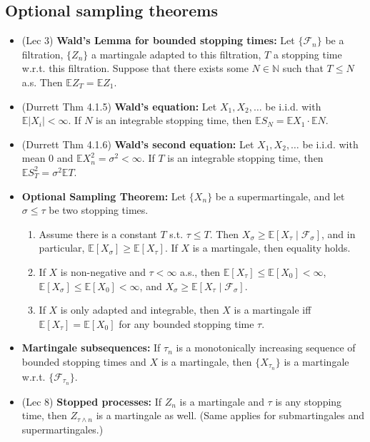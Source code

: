 \documentclass[twoside]{article}
\newcommand\bbE{\mathbb{E}}
\newcommand\bbN{\mathbb{N}}
\newcommand\calF{\mathcal{F}}
\newcommand\sg{\sigma}
\begin{document}
\subsection*{Optional sampling theorems}
\begin{itemize}
\item (Lec 3) \textbf{Wald's Lemma for bounded stopping times:} Let $\{\calF_n \}$ be a filtration, $\{ Z_n \}$ a martingale adapted to this filtration, $T$ a stopping time w.r.t. this filtration. Suppose that there exists some $N \in \bbN$ such that $T \leq N$ a.s. Then $\bbE Z_T = \bbE Z_1$.

\item (Durrett Thm 4.1.5) \textbf{Wald's equation:} Let $X_1, X_2, \dots$ be i.i.d. with $\bbE |X_i| < \infty$. If $N$ is an integrable stopping time, then $\bbE S_N = \bbE X_1 \cdot \bbE N$.

\item (Durrett Thm 4.1.6) \textbf{Wald's second equation:} Let $X_1, X_2, \dots$ be i.i.d. with mean 0 and $\bbE X_n^2 = \sg^2 < \infty$. If $T$ is an integrable stopping time, then $\bbE S_T^2 = \sg^2 \bbE T$.

\item \textbf{Optional Sampling Theorem:} Let $\{X_n\}$ be a supermartingale, and let $\sg \leq \tau$ be two stopping times.
\begin{enumerate}
\item Assume there is a constant $T$ s.t. $\tau \leq T$. Then $X_\sg \geq \bbE [X_\tau \mid \calF_\sg]$, and in particular, $\bbE [X_\sg] \geq \bbE [X_\tau]$. If $X$ is a martingale, then equality holds.

\item If $X$ is non-negative and $\tau < \infty$ a.s., then $\bbE [X_\tau] \leq \bbE[X_0] < \infty$, $\bbE [X_\sg] \leq \bbE[X_0] < \infty$, and $X_\sg \geq \bbE [X_\tau \mid \calF_\sg]$.

\item If $X$ is only adapted and integrable, then $X$ is a martingale iff $\bbE [X_\tau] = \bbE [X_0]$ for any bounded stopping time $\tau$.
\end{enumerate}

\item \textbf{Martingale subsequences:} If $\tau_n$ is a monotonically increasing sequence of bounded stopping times and $X$ is a martingale, then $\{ X_{\tau_n}\}$ is a martingale w.r.t. $\{\calF_{\tau_n} \}$.

\item (Lec 8) \textbf{Stopped processes:} If $Z_n$ is a martingale and $\tau$ is any stopping time, then $Z_{\tau \wedge n}$ is a martingale as well. (Same applies for submartingales and supermartingales.)


\end{itemize}
\end{document}
